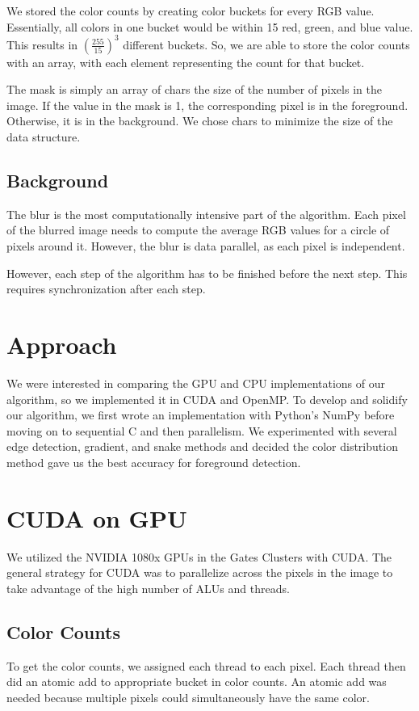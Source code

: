 \documentclass[12pt]{article}
\begin{document}
We stored the color counts by creating color buckets for every RGB value.
Essentially, all colors in one bucket would be within 15 red, green, and blue
value. This results in $\left(\tfrac{255}{15}\right)^3$ different buckets.
So, we are able to store the color counts with an array, with each element
representing the count for that bucket.

The mask is simply an array of chars the size of the number of pixels in the
image. If the value in the mask is 1, the corresponding pixel is in the
foreground. Otherwise, it is in the background. We chose chars to minimize the
size of the data structure.

\subsection{Background}
The blur is the most computationally intensive part of the algorithm. Each pixel
of the blurred image needs to compute the average RGB values for a circle
of pixels around it. However, the blur is data parallel, as each pixel is
independent.

However, each step of the algorithm has to be finished before the next step.
This requires synchronization after each step.

\section{Approach}
We were interested in comparing the GPU and CPU implementations of
our algorithm, so we implemented it in CUDA and OpenMP.
To develop and solidify our algorithm, we first wrote an implementation with
Python's NumPy before moving on to sequential C and then parallelism. We
experimented with several edge detection, gradient, and snake methods and
decided the color distribution method gave us the best accuracy for foreground
detection.

\section{CUDA on GPU}
We utilized the NVIDIA 1080x GPUs in the Gates Clusters with CUDA. The
general strategy for CUDA was to parallelize across the pixels in the image
to take advantage of the high number of ALUs and threads.

\subsection{Color Counts}
To get the color counts, we assigned each thread to each pixel. Each thread then
did an atomic add to appropriate bucket in color counts. An atomic add was
needed because multiple pixels could simultaneously have the same color.
\end{document}
